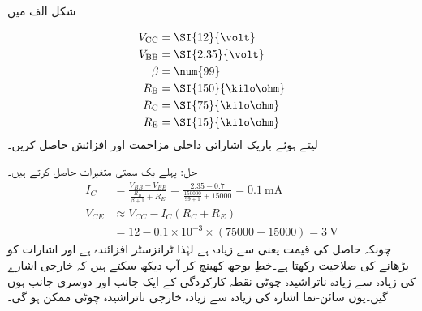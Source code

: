  
شکل  الف میں

\begin{align*}
V_{\textup{CC}}&=\SI{12}{\volt}\\
V_{\textup{BB}}&=\SI{2.35}{\volt}\\
\beta &=\num{99}\\
R_{\textup{B}}&=\SI{150}{\kilo \ohm}\\
R_{\textup {C}}&=\SI{75}{\kilo \ohm}\\
R_{\textup {E}}&=\SI{15}{\kilo \ohm}\
\end{align*}
لیتے ہوئے باریک اشاراتی داخلی مزاحمت   اور افزائش  حاصل کریں۔


حل:	پہلے یک سمتی متغیرات حاصل کرتے ہیں۔
\begin{align*}
I_C&=\frac{V_{BB}-V_{BE}}{\frac{R_B}{\beta+1}+R_E}=\frac{2.35-0.7}{\frac{150000}{99+1}+15000}=\SI{0.1}{\milli \ampere}\\
V_{CE} &\approx V_{CC}-I_C \left(R_C+R_E \right )\\
&=12-0.1 \times 10^{-3} \times \left(75000+15000 \right )=\SI{3}{\volt}
\end{align*}
چونکہ حاصل   کی قیمت  یعنی    سے زیادہ ہے لہٰذا ٹرانزسٹر افزائندہ ہے اور اشارات کو بڑھانے کی صلاحیت رکھتا ہے۔خطِ بوجھ کھینچ کر آپ دیکھ سکتے ہیں کہ خارجی اشارے کی زیادہ سے زیادہ ناتراشیدہ چوٹی نقطہ کارکردگی کے ایک جانب  اور دوسری جانب  ہوں گیں۔یوں سائن-نما اشارہ کی زیادہ سے زیادہ خارجی ناتراشیدہ چوٹی  ممکن ہو گی۔ 

